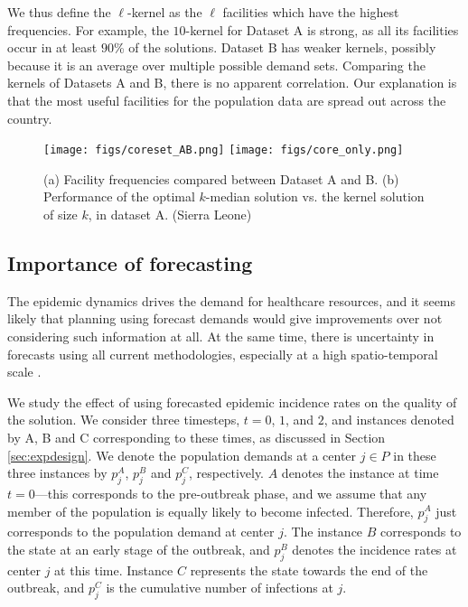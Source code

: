 We thus define the $\ell$-kernel as the $\ell$ facilities which have the highest frequencies. For example, the $10$-kernel for Dataset A is strong, as all its facilities occur in at least $90$\% of the solutions. Dataset B has weaker kernels, possibly because it is an average over multiple possible demand sets. Comparing the kernels of Datasets A and B, there is no apparent correlation. Our explanation is that the most useful facilities for the population data are spread out across the country.


\begin{figure}[h]
  \centering
    \texttt{[image: figs/coreset\_AB.png]}
    \texttt{[image: figs/core\_only.png]}
\caption{
(a) Facility frequencies compared between Dataset A and B.
(b) Performance of the optimal $k$-median solution vs. the kernel solution of size $k$, in dataset A. (Sierra Leone)
} 
        \label{fig:coreset_AB}
\end{figure}





\subsection*{Importance of forecasting}
The epidemic dynamics drives the demand for healthcare resources, and it seems
likely that planning using forecast demands would give improvements over not
considering such information at all. At the same time, there is uncertainty
in forecasts using all current methodologies, especially at a high
spatio-temporal scale \cite{chakraborty:sdm14}.

We study the effect of using forecasted epidemic incidence rates on the
quality of the solution. We consider three timesteps, $t=0$, $1$, and $2$, and
instances denoted by A, B and C corresponding to these times, as discussed in Section \ref{sec:expdesign}.
We denote the population demands at a center $j\in P$ in these three instances
by $p_j^A$, $p_j^B$ and $p_j^C$, respectively.
$A$ denotes the instance at time $t=0$---this
corresponds to the pre-outbreak phase, and 
we assume that any member of the population is equally likely to become infected.
Therefore, $p^A_j$ just corresponds to the population demand at center $j$.
The instance $B$ corresponds to the state at an early stage of the outbreak,
and $p^B_j$ denotes the incidence rates at center $j$ at this time.
Instance $C$ represents the state towards the end of the outbreak,
and $p^C_j$ is the cumulative number of infections at $j$.

